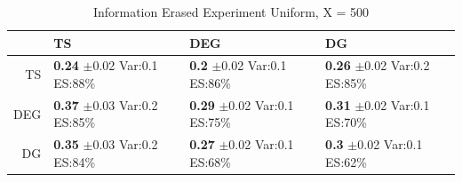 \documentclass[11pt,letterpaper]{article}
\begin{document}
\begin{table}[ht]
\centering
\caption{Information Erased Experiment Uniform, X = 500} 
\begin{tabular}{rlll}
  \hline
 & TS & DEG &  DG \\ 
  \hline
TS & \makecell{\textbf{0.24} $\pm$0.02\\Var:0.1\\ES:88\%} & \makecell{\textbf{0.2} $\pm$0.02\\Var:0.1\\ES:86\%} & \makecell{\textbf{0.26} $\pm$0.02\\Var:0.2\\ES:85\%} \\ 
  DEG & \makecell{\textbf{0.37} $\pm$0.03\\Var:0.2\\ES:85\%} & \makecell{\textbf{0.29} $\pm$0.02\\Var:0.1\\ES:75\%} & \makecell{\textbf{0.31} $\pm$0.02\\Var:0.1\\ES:70\%} \\ 
   DG & \makecell{\textbf{0.35} $\pm$0.03\\Var:0.2\\ES:84\%} & \makecell{\textbf{0.27} $\pm$0.02\\Var:0.1\\ES:68\%} & \makecell{\textbf{0.3} $\pm$0.02\\Var:0.1\\ES:62\%} \\ 
   \hline
\end{tabular}
\end{table}
\end{document}
